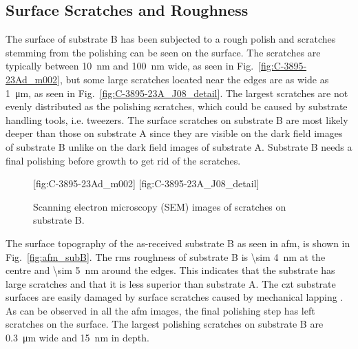 \subsection{Surface Scratches and Roughness}
The surface of substrate B has been subjected to a rough polish and scratches stemming from the polishing can be seen on the surface. The scratches are typically between \SI{10}{\nano\metre} and \SI{100}{\nano\metre} wide, as seen in Fig.~\ref{fig:C-3895-23Ad_m002}, but some large scratches located near the edges are as wide as \SI{1}{\micro\metre}, as seen in Fig.~\ref{fig:C-3895-23A_J08_detail}. The largest scratches are not evenly distributed as the polishing scratches, which could be caused by substrate handling tools, i.e. tweezers. The surface scratches on substrate B are most likely deeper than those on substrate A since they are visible on the dark field images of substrate B unlike on the dark field images of substrate A. Substrate B needs a final polishing before growth to get rid of the scratches.
\begin{figure}[htbp]
    \centering
    [fig:C-3895-23Ad_m002]
    [fig:C-3895-23A_J08_detail]
    \caption[SEM images of scratches on substrate B.]{Scanning electron microscopy (SEM) images of scratches on substrate B.}
    \label{fig:SEM_C389523_scratches}
\end{figure}

The surface topography of the as-received substrate B as seen in \ac{afm}, is shown in Fig.~\ref{fig:afm_subB}. The \ac{rms} roughness of substrate B is \SI{\sim 4}{\nano\metre} at the centre and \SI{\sim 5}{\nano\metre} around the edges. This indicates that the substrate has large scratches and that it is less superior than substrate A. The \ac{czt} substrate surfaces are easily damaged by surface scratches caused by mechanical lapping \citep{egan2009scanning}. As can be observed in all the \ac{afm} images, the final polishing step has left scratches on the surface. The largest polishing scratches on substrate B are \SI{0.3}{\micro\metre} wide and \SI{15}{\nano\metre} in depth.

